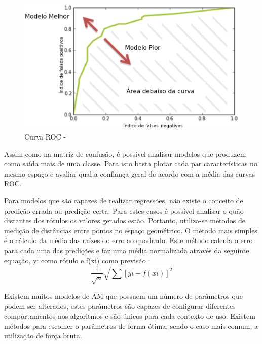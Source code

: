 \begin{figure}[!h]
\centering
\includegraphics[keepaspectratio=true,scale=0.70]
{figuras/roc.eps}
\caption{Curva ROC - \cite{howard2012b}}
\label{over}
\end{figure}


Assim como na matriz de confusão, é possível analisar modelos que produzem como saída mais de uma classe. Para isto basta plotar cada par características no mesmo espaço e avaliar qual a confiança geral de acordo com a média das curvas ROC.

Para modelos que são capazes de realizar regressões, não existe o conceito de predição errada ou predição certa. Para estes casos é possível analisar o quão distantes dos rótulos os valores gerados estão. Portanto, utiliza-se métodos de medição de distâncias entre pontos no espaço geométrico. O método mais simples é o cálculo da média das raízes do erro ao quadrado. Este método calcula o erro para cada uma das predições e faz uma média normalizada através da seguinte equação, yi como rótulo e f(xi) como previsão \cite{real2013}: 
 \[
       \frac{1}{\sqrt{n}}\sqrt{\sum \left [ y{i} - f\left ( x{i} \right )\right ]^{2} }
  \] 
  
Existem muitos modelos de AM que possuem um número de parâmetros que podem ser alterados, estes parâmetros são capazes de configurar diferentes comportamentos nos algoritmos e são únicos para cada contexto de uso. Existem métodos para escolher o parâmetros de forma ótima, sendo o caso mais comum, a utilização de força bruta. 









































